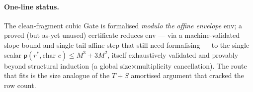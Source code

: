 \documentclass[11pt]{article}
\newcommand{\pot}{\mathsf{p}}                        %
\theoremstyle{definition}
\begin{document}
\paragraph{One-line status.} The clean-fragment cubic Gate is formalised \emph{modulo the affine envelope} $\mathrm{env}$;
a proved (but as-yet unused) certificate reduces $\mathrm{env}$ --- via a machine-validated slope bound and single-tail
affine step that still need formalising --- to the single scalar $\pot(r^{*},\text{char }c)\le M^3+3M^2$, itself
exhaustively validated and provably beyond structural induction (a global size$\times$multiplicity cancellation). The route
that fits is the size analogue of the $T+S$ amortised argument that cracked the row count.
\end{document}
